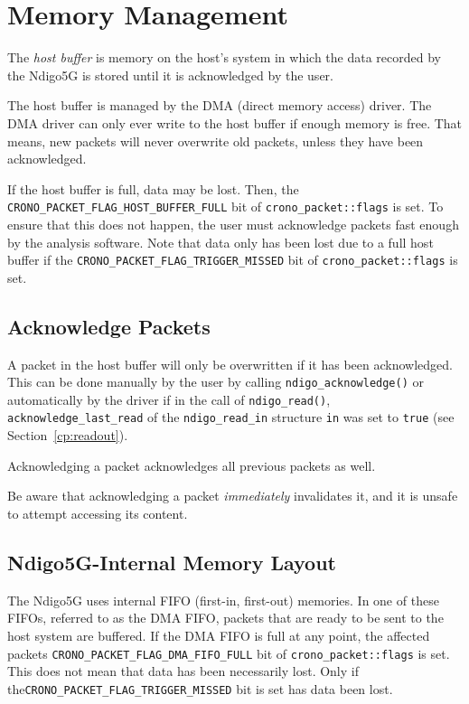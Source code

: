\section{Memory Management}

The \textit{host buffer} is memory on the host's system in which the data recorded by the Ndigo5G is stored until it is acknowledged by the user.

The host buffer is managed by the DMA (direct memory access) driver. The DMA driver can only ever write to the host buffer if enough memory is free. That means, new packets will never overwrite old packets, unless they have been acknowledged.

If the host buffer is full, data may be lost. Then, the \texttt{CRONO\_PACKET\_FLAG\_HOST\_BUFFER\_FULL} bit of \texttt{crono\_packet::flags} is set. To ensure that this does not happen, the user must acknowledge packets fast enough by the analysis software. Note that data only has been lost due to a full host buffer if the \texttt{CRONO\_PACKET\_FLAG\_TRIGGER\_MISSED} bit of \texttt{crono\_packet::flags} is set.

\subsection{Acknowledge Packets}
A packet in the host buffer will only be overwritten if it has been acknowledged. This can be done manually by the user by calling \texttt{ndigo\_acknowledge()} or automatically by the driver if in the call of \texttt{ndigo\_read()}, \texttt{acknowledge\_last\_read} of the \texttt{ndigo\_read\_in} structure \texttt{in} was set to \texttt{true} (see Section~\ref{cp:readout}).

Acknowledging a packet acknowledges all previous packets as well.

Be aware that acknowledging a packet \textit{immediately} invalidates it, and it is unsafe to attempt accessing its content.

\subsection{Ndigo5G-Internal Memory Layout}
The Ndigo5G uses internal FIFO (first-in, first-out) memories. In one of these FIFOs, referred to as the DMA FIFO, packets that are ready to be sent to the host system are buffered. If the DMA FIFO is full at any point, the affected packets \texttt{CRONO\_PACKET\_FLAG\_DMA\_FIFO\_FULL} bit of \texttt{crono\_packet::flags} is set. This does not mean that data has been necessarily lost. Only if the\newline\texttt{CRONO\_PACKET\_FLAG\_TRIGGER\_MISSED} bit is set has data been lost.


